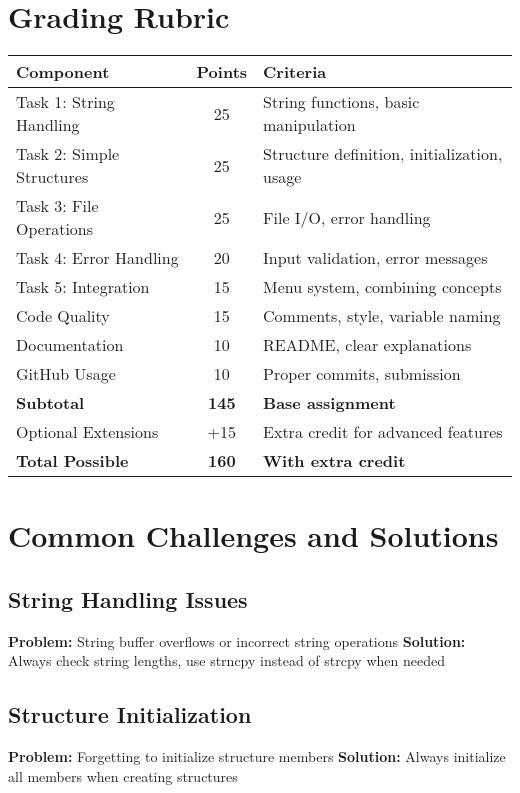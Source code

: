 \documentclass[11pt,a4paper]{article}
\begin{document}
\section{Grading Rubric}

\begin{center}
\begin{tabular}{|l|c|l|}
\hline
\textbf{Component} & \textbf{Points} & \textbf{Criteria} \\
\hline
Task 1: String Handling & 25 & String functions, basic manipulation \\
Task 2: Simple Structures & 25 & Structure definition, initialization, usage \\
Task 3: File Operations & 25 & File I/O, error handling \\
Task 4: Error Handling & 20 & Input validation, error messages \\
Task 5: Integration & 15 & Menu system, combining concepts \\
Code Quality & 15 & Comments, style, variable naming \\
Documentation & 10 & README, clear explanations \\
GitHub Usage & 10 & Proper commits, submission \\
\hline
\textbf{Subtotal} & \textbf{145} & \textbf{Base assignment} \\
\hline
Optional Extensions & +15 & Extra credit for advanced features \\
\hline
\textbf{Total Possible} & \textbf{160} & \textbf{With extra credit} \\
\hline
\end{tabular}
\end{center}

\section{Common Challenges and Solutions}

\subsection{String Handling Issues}
\textbf{Problem:} String buffer overflows or incorrect string operations
\textbf{Solution:} Always check string lengths, use strncpy instead of strcpy when needed

\subsection{Structure Initialization}
\textbf{Problem:} Forgetting to initialize structure members
\textbf{Solution:} Always initialize all members when creating structures
\end{document}
